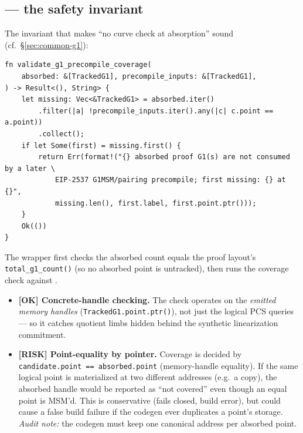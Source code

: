 \subsection{ --- the safety invariant}
\label{sec:coverage-invariant}

The invariant that makes ``no curve check at absorption'' sound
(cf.\ \S\ref{sec:common-g1}):
\begin{lstlisting}[style=rust]
fn validate_g1_precompile_coverage(
    absorbed: &[TrackedG1], precompile_inputs: &[TrackedG1],
) -> Result<(), String> {
    let missing: Vec<&TrackedG1> = absorbed.iter()
        .filter(|a| !precompile_inputs.iter().any(|c| c.point == a.point))
        .collect();
    if let Some(first) = missing.first() {
        return Err(format!("{} absorbed proof G1(s) are not consumed by a later \
            EIP-2537 G1MSM/pairing precompile; first missing: {} at {}",
            missing.len(), first.label, first.point.ptr()));
    }
    Ok(())
}
\end{lstlisting}
The wrapper
 first checks the
absorbed count equals the proof layout's \texttt{total\_\allowbreak{}g1\_\allowbreak{}count()}
(so no absorbed point is untracked), then runs the coverage check
against \cg{precompile\_\allowbreak{}validated\_\allowbreak{}g1s}.

\begin{itemize}
  \item \textcolor{tracegreen}{\textbf{[OK] Concrete-handle checking.}}
        The check operates on the \emph{emitted memory handles}
        (\texttt{TrackedG1.point.ptr()}), not just the logical PCS
        queries --- so it catches quotient limbs hidden behind the
        synthetic linearization commitment.
  \item \textcolor{rustorange}{\textbf{[RISK] Point-equality by pointer.}}
        Coverage is decided by \texttt{candidate.point == absorbed.point}
        (memory-handle equality). If the same logical point is materialized
        at two different addresses (e.g.\ a copy), the absorbed handle
        would be reported as ``not covered'' even though an equal point
        is MSM'd. This is conservative (fails closed, build error), but
        could cause a false build failure if the codegen ever duplicates
        a point's storage. \emph{Audit note:} the codegen must keep one
        canonical address per absorbed point.
\end{itemize}

